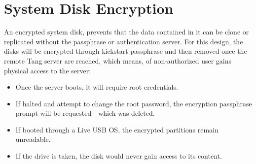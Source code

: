 
\section{System Disk Encryption}

An encrypted system disk, prevents that the data contained in it can be clone or replicated without the passphrase or authentication server. For this design, the disks will be encrypted through kickstart passphrase and then removed once the remote Tang server are reached, which means, of non-authorized user gains physical access to the server:
\begin{itemize}
  \item Once the server boots, it will require root credentials.
  \item If halted and attempt to change the root password, the encryption passphrase prompt will be requested - which was deleted.
  \item If booted through a Live USB OS, the encrypted partitions remain unreadable.
  \item If the drive is taken, the disk would never gain access to its content.
\end{itemize}

